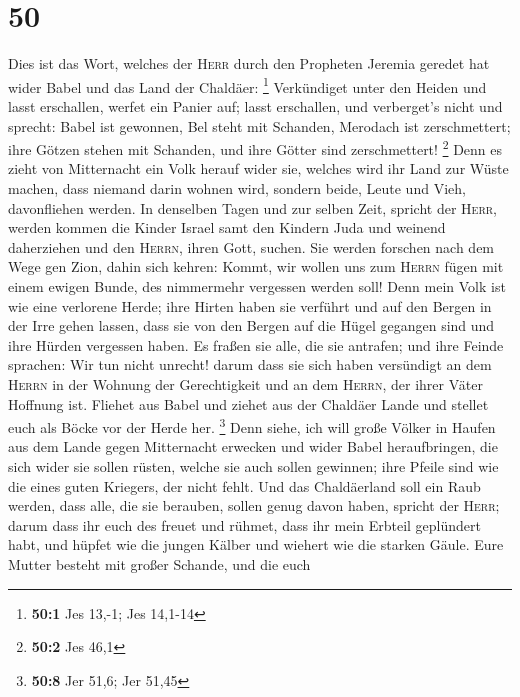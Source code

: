 \hypertarget{section-13}{%
\section{50}\label{section-13}}

 Dies ist das Wort, welches der \textsc{Herr} durch den
Propheten Jeremia geredet hat wider Babel und das Land der Chaldäer:
\footnote{\textbf{50:1} Jes 13,-1; Jes 14,1-14} 
Verkündiget unter den Heiden und lasst erschallen, werfet ein Panier
auf; lasst erschallen, und verberget's nicht und sprecht: Babel ist
gewonnen, Bel steht mit Schanden, Merodach ist zerschmettert; ihre
Götzen stehen mit Schanden, und ihre Götter sind zerschmettert!
\footnote{\textbf{50:2} Jes 46,1}  Denn es zieht von
Mitternacht ein Volk herauf wider sie, welches wird ihr Land zur Wüste
machen, dass niemand darin wohnen wird, sondern beide, Leute und Vieh,
davonfliehen werden.  In denselben Tagen und zur selben
Zeit, spricht der \textsc{Herr}, werden kommen die Kinder Israel samt
den Kindern Juda und weinend daherziehen und den \textsc{Herrn}, ihren
Gott, suchen.  Sie werden forschen nach dem Wege gen Zion,
dahin sich kehren: Kommt, wir wollen uns zum \textsc{Herrn} fügen mit
einem ewigen Bunde, des nimmermehr vergessen werden soll! 
Denn mein Volk ist wie eine verlorene Herde; ihre Hirten haben sie
verführt und auf den Bergen in der Irre gehen lassen, dass sie von den
Bergen auf die Hügel gegangen sind und ihre Hürden vergessen haben.
 Es fraßen sie alle, die sie antrafen; und ihre Feinde
sprachen: Wir tun nicht unrecht! darum dass sie sich haben versündigt an
dem \textsc{Herrn} in der Wohnung der Gerechtigkeit und an dem
\textsc{Herrn}, der ihrer Väter Hoffnung ist.  Fliehet aus
Babel und ziehet aus der Chaldäer Lande und stellet euch als Böcke vor
der Herde her. \footnote{\textbf{50:8} Jer 51,6; Jer 51,45}
 Denn siehe, ich will große Völker in Haufen aus dem Lande
gegen Mitternacht erwecken und wider Babel heraufbringen, die sich wider
sie sollen rüsten, welche sie auch sollen gewinnen; ihre Pfeile sind wie
die eines guten Kriegers, der nicht fehlt.  Und das
Chaldäerland soll ein Raub werden, dass alle, die sie berauben, sollen
genug davon haben, spricht der \textsc{Herr};  darum dass
ihr euch des freuet und rühmet, dass ihr mein Erbteil geplündert habt,
und hüpfet wie die jungen Kälber und wiehert wie die starken Gäule.
 Eure Mutter besteht mit großer Schande, und die euch
